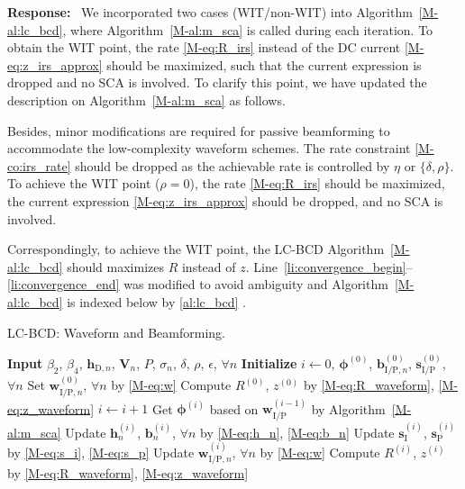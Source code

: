 \documentclass{article}
\newcounter{reviewer}
\newcounter{point}[reviewer]
\newcounter{response}[reviewer]
\newenvironment{response}
	{\refstepcounter{response} \medskip \noindent \textbf{Response:}\ }
	{\medskip}
\begin{document}
\begin{reviewer}
		\begin{response}
			We incorporated two cases (WIT/non-WIT) into Algorithm~\ref{M-al:lc_bcd}, where Algorithm~\ref{M-al:m_sca} is called during each iteration. To obtain the WIT point, the rate \eqref{M-eq:R_irs} instead of the DC current \eqref{M-eq:z_irs_approx} should be maximized, such that the current expression is dropped and no SCA is involved. To clarify this point, we have updated the description on Algorithm~\ref{M-al:m_sca} as follows.
			\begin{framed}
				Besides, minor modifications are required for passive beamforming to accommodate the low-complexity waveform schemes. The rate constraint \eqref{M-co:irs_rate} should be dropped as the achievable rate is controlled by $\eta$ or $\{\delta,\rho\}$. To achieve the WIT point ($\rho=0$), the rate \eqref{M-eq:R_irs} should be maximized, the current expression \eqref{M-eq:z_irs_approx} should be dropped, and no SCA is involved.
			\end{framed}
			Correspondingly, to achieve the WIT point, the LC-BCD Algorithm~\ref{M-al:lc_bcd} should maximizes $R$ instead of $z$. Line~\ref{li:convergence_begin}--\ref{li:convergence_end} was modified to avoid ambiguity and Algorithm~\ref{M-al:lc_bcd} is indexed below by \ref{al:lc_bcd} .
			\begin{algorithm}[!h]
				\caption{LC-BCD: Waveform and Beamforming.}
				\label{al:lc_bcd}
				\begin{algorithmic}[1]
					\State \textbf{Input} $\beta_2$, $\beta_4$, $\boldsymbol{h}_{\mathrm{D},n}$, $\boldsymbol{V}_{n}$, $P$, $\sigma_n$, $\delta$, $\rho$, $\epsilon$, $\forall n$
					\State \textbf{Initialize} $i \gets 0$, $\boldsymbol{\phi}^{(0)}$, $\boldsymbol{b}_{\mathrm{I/P},n}^{(0)}$, $\boldsymbol{s}_{\mathrm{I/P}}^{(0)}$, $\forall n$
					\State Set $\boldsymbol{w}_{\mathrm{I/P},n}^{(0)}$, $\forall n$ by \eqref{M-eq:w}
					\State Compute $R^{(0)}$, $z^{(0)}$ by \eqref{M-eq:R_waveform}, \eqref{M-eq:z_waveform}
					\Repeat
						\State $i \gets i + 1$
						\State Get $\boldsymbol{\phi}^{(i)}$ based on $\boldsymbol{w}_{\mathrm{I/P}}^{(i-1)}$ by Algorithm~\ref{M-al:m_sca}
						\State Update $\boldsymbol{h}_n^{(i)}$, $\boldsymbol{b}_n^{(i)}$, $\forall n$ by \eqref{M-eq:h_n}, \eqref{M-eq:b_n}
						\State Update $\boldsymbol{s}_{\mathrm{I}}^{(i)}$, $\boldsymbol{s}_{\mathrm{P}}^{(i)}$ by \eqref{M-eq:s_i}, \eqref{M-eq:s_p}
						\State Update $\boldsymbol{w}_{\mathrm{I/P},n}^{(i)}$, $\forall n$ by \eqref{M-eq:w}
						\State Compute $R^{(i)}$, $z^{(i)}$ by \eqref{M-eq:R_waveform}, \eqref{M-eq:z_waveform}

\end{algorithmic}
\end{algorithm}
\end{response}
\end{reviewer}
\end{document}
